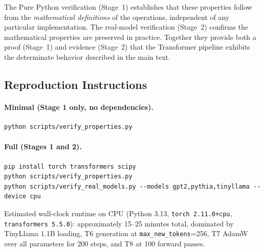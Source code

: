 \documentclass[a4paper,twocolumn,11pt]{article}
\begin{document}
The Pure Python verification (Stage~1) establishes that these properties follow from the \emph{mathematical definitions} of the operations, independent of any particular implementation. The real-model verification (Stage~2) confirms the mathematical properties are preserved in practice. Together they provide both a proof (Stage~1) and evidence (Stage~2) that the Transformer pipeline exhibits the determinate behavior described in the main text.

\subsection{Reproduction Instructions}
\label{sec:B5}

\paragraph{Minimal (Stage 1 only, no dependencies).}
\begin{verbatim}
python scripts/verify_properties.py
\end{verbatim}

\paragraph{Full (Stages 1 and 2).}
\begin{verbatim}
pip install torch transformers scipy
python scripts/verify_properties.py
python scripts/verify_real_models.py --models gpt2,pythia,tinyllama --device cpu
\end{verbatim}

Estimated wall-clock runtime on CPU (Python 3.13, \texttt{torch 2.11.0+cpu}, \texttt{transformers 5.5.0}): approximately 15--25 minutes total, dominated by TinyLlama 1.1B loading, T6 generation at \texttt{max\_new\_tokens}=256, T7 AdamW over all parameters for 200 steps, and T8 at 100 forward passes.
\end{document}
